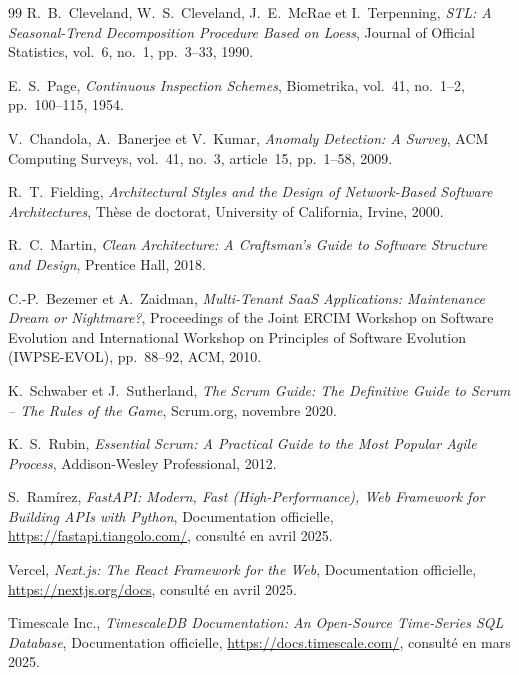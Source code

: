 \begin{thebibliography}{99}
R.~B.~Cleveland, W.~S.~Cleveland, J.~E.~McRae et I.~Terpenning,
\textit{STL: A Seasonal-Trend Decomposition Procedure Based on Loess},
Journal of Official Statistics, vol.~6, no.~1, pp.~3--33, 1990.

E.~S.~Page,
\textit{Continuous Inspection Schemes},
Biometrika, vol.~41, no.~1--2, pp.~100--115, 1954.

V.~Chandola, A.~Banerjee et V.~Kumar,
\textit{Anomaly Detection: A Survey},
ACM Computing Surveys, vol.~41, no.~3, article~15, pp.~1--58, 2009.


R.~T.~Fielding,
\textit{Architectural Styles and the Design of Network-Based Software Architectures},
Thèse de doctorat, University of California, Irvine, 2000.

R.~C.~Martin,
\textit{Clean Architecture: A Craftsman's Guide to Software Structure and Design},
Prentice Hall, 2018.

C.-P.~Bezemer et A.~Zaidman,
\textit{Multi-Tenant SaaS Applications: Maintenance Dream or Nightmare?},
Proceedings of the Joint ERCIM Workshop on Software Evolution and International Workshop on Principles of Software Evolution (IWPSE-EVOL), pp.~88--92, ACM, 2010.


K.~Schwaber et J.~Sutherland,
\textit{The Scrum Guide: The Definitive Guide to Scrum -- The Rules of the Game},
Scrum.org, novembre 2020.

K.~S.~Rubin,
\textit{Essential Scrum: A Practical Guide to the Most Popular Agile Process},
Addison-Wesley Professional, 2012.


S.~Ramírez,
\textit{FastAPI: Modern, Fast (High-Performance), Web Framework for Building APIs with Python},
Documentation officielle, \url{https://fastapi.tiangolo.com/}, consulté en avril 2025.

Vercel,
\textit{Next.js: The React Framework for the Web},
Documentation officielle, \url{https://nextjs.org/docs}, consulté en avril 2025.

Timescale Inc.,
\textit{TimescaleDB Documentation: An Open-Source Time-Series SQL Database},
Documentation officielle, \url{https://docs.timescale.com/}, consulté en mars 2025.


\end{thebibliography}
